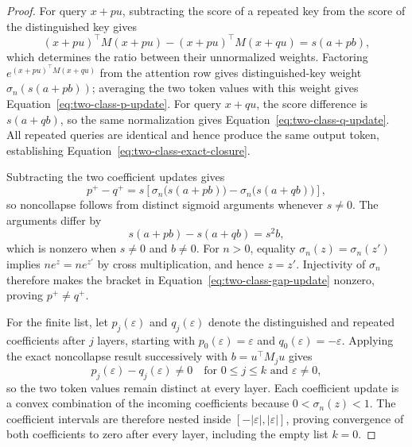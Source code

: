 \documentclass[mlmain]{jmlr}
\begin{document}
\begin{proof}
For query $x+pu$, subtracting the score of a repeated key from the score of
the distinguished key gives
\begin{equation}
 (x+pu)^\top M(x+pu)-(x+pu)^\top M(x+qu)=s(a+pb),
 \label{eq:two-class-distinguished-score}
\end{equation}
which determines the ratio between their unnormalized weights.  Factoring
$e^{(x+pu)^\top M(x+qu)}$ from the attention row gives distinguished-key
weight $\sigma_n(s(a+pb))$; averaging the two token values with this weight
gives Equation~\eqref{eq:two-class-p-update}.  For query $x+qu$, the score
difference is $s(a+qb)$, so the same normalization gives
Equation~\eqref{eq:two-class-q-update}.  All repeated queries are identical
and hence produce the same output token, establishing
Equation~\eqref{eq:two-class-exact-closure}.

Subtracting the two coefficient updates gives
\begin{equation}
 p^+-q^+
 =s\left[\sigma_n\!\bigl(s(a+pb)\bigr)
          -\sigma_n\!\bigl(s(a+qb)\bigr)\right],
 \label{eq:two-class-gap-update}
\end{equation}
so noncollapse follows from distinct sigmoid arguments whenever $s\ne0$.
The arguments differ by
\begin{equation}
 s(a+pb)-s(a+qb)=s^2b,
 \label{eq:two-class-logit-gap}
\end{equation}
which is nonzero when $s\ne0$ and $b\ne0$.  For $n>0$, equality
$\sigma_n(z)=\sigma_n(z')$ implies $ne^z=ne^{z'}$ by cross multiplication,
and hence $z=z'$.  Injectivity of $\sigma_n$ therefore makes the bracket in
Equation~\eqref{eq:two-class-gap-update} nonzero, proving $p^+\ne q^+$.

For the finite list, let $p_j(\varepsilon)$ and $q_j(\varepsilon)$ denote
the distinguished and repeated coefficients after $j$ layers, starting
with $p_0(\varepsilon)=\varepsilon$ and $q_0(\varepsilon)=-\varepsilon$.
Applying the exact noncollapse result
successively with $b=u^\top M_j u$ gives
\begin{equation}
 p_j(\varepsilon)-q_j(\varepsilon)\ne0
 \quad\text{for }0\le j\le k\text{ and }\varepsilon\ne0,
 \label{eq:two-class-prefix-noncollapse}
\end{equation}
so the two token values remain distinct at every layer.  Each coefficient update is a
convex combination of the incoming coefficients because
$0<\sigma_n(z)<1$.  The coefficient intervals are therefore nested inside
$[-|\varepsilon|,|\varepsilon|]$, proving convergence of both coefficients
to zero after every layer, including the empty list $k=0$.
\end{proof}
\end{document}
